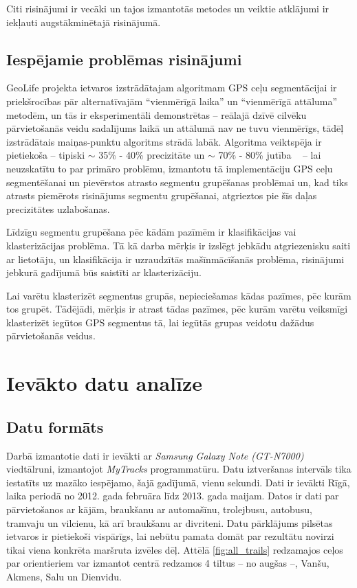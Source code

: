 \documentclass{ludis}
\begin{document}
Citi risinājumi ir vecāki un tajos izmantotās metodes un veiktie atklājumi ir iekļauti
augstākminētajā risinājumā.

\section{Iespējamie problēmas risinājumi}
GeoLife projekta ietvaros izstrādātajam algoritmam GPS ceļu segmentācijai ir priekšrocības 
pār alternatīvajām ``vienmērīgā laika'' un ``vienmērīgā attāluma'' metodēm, un tās ir
eksperimentāli demonstrētas -- reālajā dzīvē cilvēku pārvietošanās veidu sadalījums laikā 
un attālumā nav ne tuvu vienmērīgs, tādēļ izstrādātais maiņas-punktu algoritms strādā labāk.
Algoritma veiktspēja ir pietiekoša -- tipiski $\sim$ 35\% - 40\% 
precizitāte un $\sim$ 70\% - 80\% jutība ~\cite{zheng_gps_segmentation} -- 
lai neuzskatītu to par primāro problēmu, izmantotu tā implementāciju GPS ceļu segmentēšanai 
un pievērstos atrasto segmentu grupēšanas problēmai un, kad tiks atrasts piemērots risinājums
segmentu grupēšanai, atgrieztos pie šīs daļas precizitātes uzlabošanas.

Līdzīgu segmentu grupēšana pēc kādām pazīmēm ir klasifikācijas vai klasterizācijas problēma. Tā kā
darba mērķis ir izslēgt jebkādu atgriezenisku saiti ar lietotāju, un klasifikācija ir uzraudzītās
mašīnmācīšanās problēma, risinājumi jebkurā gadījumā būs saistīti ar klasterizāciju.

Lai varētu klasterizēt segmentus grupās, nepieciešamas kādas pazīmes, pēc kurām tos grupēt. Tādējādi,
mērķis ir atrast tādas pazīmes, pēc kurām varētu veiksmīgi klasterizēt iegūtos GPS segmentus tā,
lai iegūtās grupas veidotu dažādus pārvietošanās veidus.

\chapter{Ievākto datu analīze}
\section{Datu formāts}
Darbā izmantotie dati ir ievākti ar \emph{Samsung Galaxy Note (GT-N7000)} viedtālruni, izmantojot
\emph{MyTracks} programmatūru. Datu iztveršanas intervāls tika iestatīts uz mazāko iespējamo,
šajā gadījumā, vienu sekundi. Dati ir ievākti Rīgā, laika periodā no 2012. gada februāra līdz 
2013. gada maijam. Datos ir dati par pārvietošanos ar kājām, braukšanu ar automašīnu, trolejbusu,
autobusu, tramvaju un vilcienu, kā arī braukšanu ar divriteni. Datu pārklājums pilsētas ietvaros 
ir pietiekoši vispārīgs, lai nebūtu pamata domāt par rezultātu novirzi tikai viena konkrēta 
maršruta izvēles dēļ. Attēlā \ref{fig:all_trails} redzamajos ceļos par orientieriem var izmantot
centrā redzamos 4 tiltus -- no augšas --, Vanšu, Akmens, Salu un Dienvidu.
\end{document}
